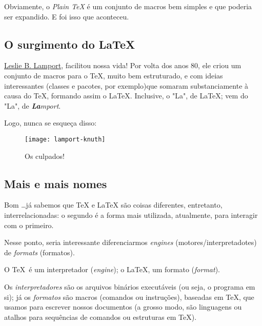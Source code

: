 Obviamente, o \textit{Plain \TeX} é um conjunto de macros bem simples e que 
poderia ser expandido.
E foi isso que aconteceu.

\subsection{O surgimento do \LaTeX} %

\href{https://pt.wikipedia.org/wiki/Leslie_Lamport}{Leslie B. Lamport}, facilitou 
nossa vida! 
Por volta dos anos 80, ele criou um conjunto de macros para o \TeX, muito bem 
estruturado, e com ideias interessantes (classes e pacotes, por exemplo)que 
somaram substanciamente à causa do \TeX{}, formando assim o \LaTeX.
Inclusive, o "La", de \LaTeX{}; vem do "La", de \textit{\textbf{La}mport}.

Logo, nunca se esqueça disso:

\begin{center}
\end{center}

\begin{figure}[!ht]
  \centering
  \texttt{[image: lamport-knuth]}
  \caption{Os culpados!}
\end{figure}

\subsection{Mais e mais nomes} %

Bom \ldots já sabemos que  \TeX{} e \LaTeX{} são coisas diferentes, entretanto,
interrelacionadas: o segundo é a forma mais utilizada, atualmente, para 
interagir com o primeiro.

Nesse ponto, seria interessante diferenciarmos \textit{engines} (motores/interpretadotes) 
de \textit{formats} (formatos).

O \TeX\ é um interpretador (\textit{engine}); o \LaTeX, um formato (\textit{format}).


Os \textit{interpretadores} são os arquivos binários executáveis (ou seja, o 
programa em si); já os \textit{formatos} são macros (comandos ou instruções), 
baseadas em \TeX, que usamos para escrever nossos documentos (a grosso modo, são
linguagens ou atalhos para sequências de comandos ou estruturas em \TeX).

